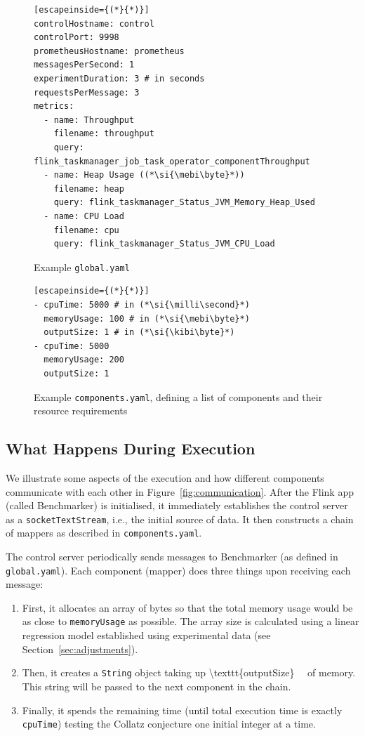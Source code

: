 \documentclass{article}
\begin{document}
\begin{figure}
  \centering
\begin{lstlisting}[escapeinside={(*}{*)}]
controlHostname: control
controlPort: 9998
prometheusHostname: prometheus
messagesPerSecond: 1
experimentDuration: 3 # in seconds
requestsPerMessage: 3
metrics:
  - name: Throughput
    filename: throughput
    query: flink_taskmanager_job_task_operator_componentThroughput
  - name: Heap Usage ((*\si{\mebi\byte}*))
    filename: heap
    query: flink_taskmanager_Status_JVM_Memory_Heap_Used
  - name: CPU Load
    filename: cpu
    query: flink_taskmanager_Status_JVM_CPU_Load
\end{lstlisting}
  \caption{Example \texttt{global.yaml}}
  \label{fig:global}
\end{figure}

\begin{figure}
  \centering
\begin{lstlisting}[escapeinside={(*}{*)}]
- cpuTime: 5000 # in (*\si{\milli\second}*)
  memoryUsage: 100 # in (*\si{\mebi\byte}*)
  outputSize: 1 # in (*\si{\kibi\byte}*)
- cpuTime: 5000
  memoryUsage: 200
  outputSize: 1
\end{lstlisting}
  \caption{Example \texttt{components.yaml}, defining a list of components and
    their resource requirements}
  \label{fig:components}
\end{figure}

\subsection{What Happens During Execution} \label{sec:execution}

We illustrate some aspects of the execution and how different components
communicate with each other in Figure~\ref{fig:communication}. After the Flink
app (called Benchmarker) is initialised, it immediately establishes the control
server as a \texttt{socketTextStream}, i.e., the initial source of data. It then
constructs a chain of mappers as described in \texttt{components.yaml}.

The control server periodically sends messages to Benchmarker (as defined in
\texttt{global.yaml}). Each component (mapper) does three things upon receiving
each message:
\begin{enumerate}
\item First, it allocates an array of bytes so that the total memory usage would
  be as close to \texttt{memoryUsage} as possible. The array size is calculated
  using a linear regression model established using experimental data (see
  Section~\ref{sec:adjustments}).
\item Then, it creates a \texttt{String} object taking up \SI[number-math-rm =
  \mathnormal, parse-numbers = false]{\texttt{outputSize}}{\kibi\byte} of
  memory. This string will be passed to the next component in the chain.
\item Finally, it spends the remaining time (until total execution time is
  exactly \texttt{cpuTime}) testing the Collatz conjecture \cite{collatz} one
  initial integer at a time.
\end{enumerate}
\end{document}
